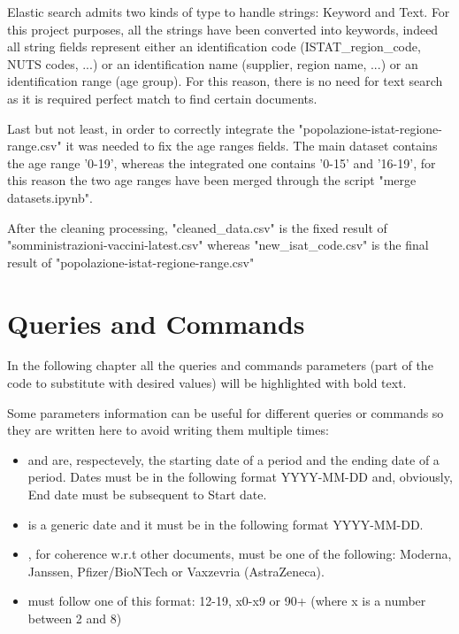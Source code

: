 \documentclass{article}
\begin{document}
\hfill\break
Elastic search admits two kinds of type to handle strings: Keyword and Text.
For this project purposes, all the strings have been converted into keywords, indeed all string fields represent either an identification code (ISTAT\_region\_code, NUTS codes, ...) or an identification name (supplier, region name, ...) or an identification range (age group).
For this reason, there is no need for text search as it is required perfect match to find certain documents.

\hfill\break
Last but not least, in order to correctly integrate the {\selectfont"popolazione-istat-regione-range.csv"} it was needed to fix the age ranges fields. The main dataset contains the age range '0-19', whereas the integrated one contains '0-15' and '16-19', for this reason the two age ranges have been merged through the script {\selectfont"merge datasets.ipynb"}.

\hfill\break
After the cleaning processing, {\selectfont"cleaned\_data.csv"} is the fixed result of {\selectfont"somministrazioni-vaccini-latest.csv"} whereas {\selectfont"new\_isat\_code.csv"} is the final result of {\selectfont"popolazione-istat-regione-range.csv"}

\newpage
\section{Queries and Commands}
In the following chapter all the queries and commands parameters (part of the code to substitute with desired values) will be highlighted with {\color{magenta}{magenta}} bold text.

Some parameters information can be useful for different queries or commands so they are written here to avoid writing them multiple times:
\begin{itemize}
    \item {\color{magenta}{Start date}} and {\color{magenta}{End date}} are, respectevely, the starting date of a period and the ending date of a period. Dates must be in the following format YYYY-MM-DD and, obviously, End date must be subsequent to Start date.
    \item {\color{magenta}{Date}} is a generic date and it must be in the following format YYYY-MM-DD.
    \item {\color{magenta}{Supplier}}, for coherence w.r.t other documents, must be one of the following: Moderna, Janssen, Pfizer/BioNTech or Vaxzevria (AstraZeneca).
    \item {\color{magenta}{Age range}} must follow one of this format: 12-19, x0-x9 or 90+ (where x is a number between 2 and 8)
\end{itemize}
\end{document}
